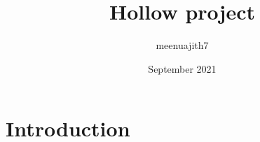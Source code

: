 \documentclass{article}
\title{Hollow project}
\author{meenuajith7 }
\date{September 2021}
\begin{document}
\maketitle

\section{Introduction}
\end{document}
